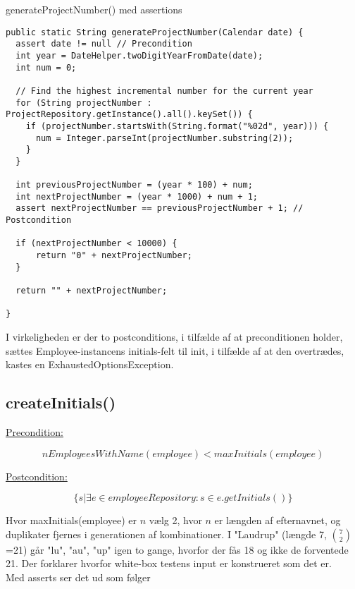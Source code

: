 \begin{listing}[H]
    \centering
    \caption{generateProjectNumber() med assertions}\label{lst:cgenerate_project_number_assertions}
    \begin{verbatim}
public static String generateProjectNumber(Calendar date) {
  assert date != null // Precondition
  int year = DateHelper.twoDigitYearFromDate(date);
  int num = 0;

  // Find the highest incremental number for the current year
  for (String projectNumber : ProjectRepository.getInstance().all().keySet()) {
    if (projectNumber.startsWith(String.format("%02d", year))) {
      num = Integer.parseInt(projectNumber.substring(2));
    }
  }

  int previousProjectNumber = (year * 100) + num;
  int nextProjectNumber = (year * 1000) + num + 1;
  assert nextProjectNumber == previousProjectNumber + 1; // Postcondition
  
  if (nextProjectNumber < 10000) {
      return "0" + nextProjectNumber;
  }

  return "" + nextProjectNumber;

}
    \end{verbatim}
\end{listing}
\noindent
I virkeligheden er der to postconditions, i tilfælde af at preconditionen holder, sættes Employee-instancens initials-felt til init, i tilfælde af at den overtrædes, kastes en ExhaustedOptionsException.\\[4mm]
\subsection{createInitials()} \label{sec:contract_create_initials}
\underline{Precondition:}
\vspace{4pt}

\begin{equation}
    nEmployeesWithName(employee) < maxInitials(employee)
\end{equation}
\vspace{4pt}

\noindent
\underline{Postcondition:}
\vspace{4pt}

\begin{equation}
    \{s | \exists e \in employeeRepository : s \in e.getInitials()\}
\end{equation}
\vspace{4pt}

\noindent
Hvor maxInitials(employee) er $n$ vælg 2, hvor $n$ er længden af efternavnet, og duplikater fjernes i generationen af kombinationer.
I "Laudrup" (længde 7, $7 \choose 2$=21) går "lu", "au", "up" igen to gange, hvorfor der fås 18 og ikke de forventede 21. Der forklarer hvorfor white-box testens input er konstrueret som det er.\\[4mm]
Med asserts ser det ud som følger

